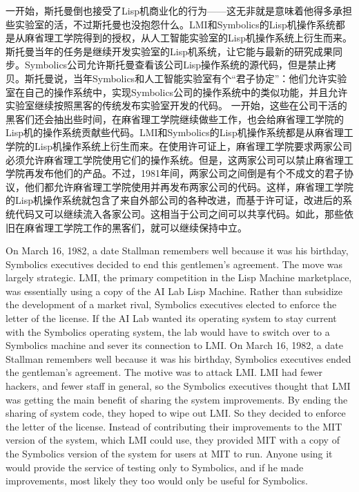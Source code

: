 \ifdefined\chs
\ifdefined\vone
一开始，斯托曼倒也接受了Lisp机商业化的行为——这无非就是意味着他得多承担些实验室的活，不过斯托曼也没抱怨什么。LMI和Symbolics的Lisp机操作系统都是从麻省理工学院得到的授权，从人工智能实验室的Lisp机操作系统上衍生而来。斯托曼当年的任务是继续开发实验室的Lisp机系统，让它能与最新的研究成果同步。Symbolics公司允许斯托曼查看该公司Lisp操作系统的源代码，但是禁止拷贝。斯托曼说，当年Symbolics和人工智能实验室有个``君子协定''：他们允许实验室在自己的操作系统中，实现Symbolics公司的操作系统中的类似功能，并且允许实验室继续按照黑客的传统发布实验室开发的代码。
\fi
\ifdefined\vtwo
一开始，这些在公司干活的黑客们还会抽出些时间，在麻省理工学院继续做些工作，也会给麻省理工学院的Lisp机的操作系统贡献些代码。LMI和Symbolics的Lisp机操作系统都是从麻省理工学院的Lisp机操作系统上衍生而来。在使用许可证上，麻省理工学院要求两家公司必须允许麻省理工学院使用它们的操作系统。但是，这两家公司可以禁止麻省理工学院再发布他们的产品。不过，1981年间，两家公司之间倒是有个不成文的君子协议，他们都允许麻省理工学院使用并再发布两家公司的代码。这样，麻省理工学院的Lisp机操作系统就包含了来自外部公司的各种改进，而基于许可证，改进后的系统代码又可以继续流入各家公司。这相当于公司之间可以共享代码。如此，那些依旧在麻省理工学院工作的黑客们，就可以继续保持中立。
\fi
\fi

\ifdefined\eng
\ifdefined\vone
On March 16, 1982, a date Stallman remembers well because it was his birthday, Symbolics executives decided to end this gentlemen's agreement. The move was largely strategic. LMI, the primary competition in the Lisp Machine marketplace, was essentially using a copy of the AI Lab Lisp Machine. Rather than subsidize the development of a market rival, Symbolics executives elected to enforce the letter of the license. If the AI Lab wanted its operating system to stay current with the Symbolics operating system, the lab would have to switch over to a Symbolics machine and sever its connection to LMI.
\fi
\ifdefined\vtwo
On March 16, 1982, a date Stallman remembers well because it was his birthday, Symbolics executives ended the gentleman's agreement. The motive was to attack LMI. LMI had fewer hackers, and fewer staff in general, so the Symbolics executives thought that LMI was getting the main benefit of sharing the system improvements.  By ending the sharing of system code, they hoped to wipe out LMI.  So they decided to enforce the letter of the license.  Instead of contributing their improvements to the MIT version of the system, which LMI could use, they provided MIT with a copy of the Symbolics version of the system for users at MIT to run.  Anyone using it would provide the service of testing only to Symbolics, and if he made improvements, most likely they too would only be useful for Symbolics.
\fi
\fi

